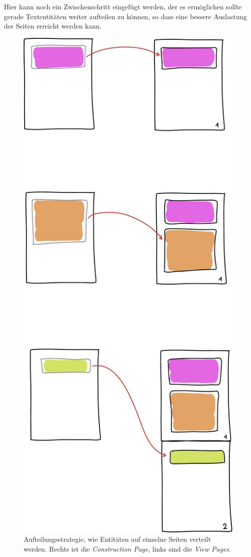 Hier kann noch ein Zwischenschritt eingefügt werden, der es ermöglichen
sollte gerade Textentitäten weiter aufteilen zu können, so dass eine
bessere Auslastung der Seiten erreicht werden kann.

\newpage
\begin{figure}[h!]
  \centering
    \includegraphics[height=0.9\textheight]{figures/aufteilungsstrategie.pdf}
  \caption{Aufteilungsstrategie, wie Entitäten auf einzelne Seiten
           verteilt werden. Rechts ist die \emph{Construction Page},
           links sind die \emph{View Pages}.}
  \label{fig-aufteilungsstrategie}
\end{figure}
\newpage

